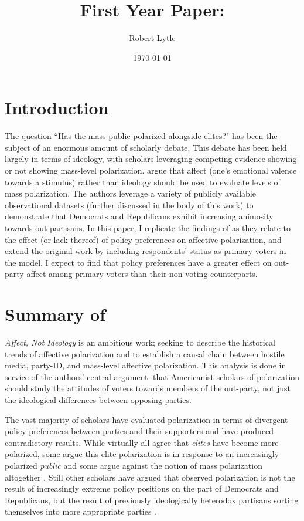 \documentclass[12pt]{article}
\begin{document}
\title{First Year Paper:\\ \large{\citet{iyengar2012affect}}}
\author{Robert Lytle}
\date{\today}
\maketitle
\thispagestyle{empty}
\clearpage
\section{Introduction}
The question ``Has the mass public polarized alongside elites?" has been the subject of an enormous amount of scholarly debate. This debate has been held largely in terms of ideology, with scholars leveraging competing evidence showing \citep{abramowitz2010disappearing} or not showing \citep{fiorina2012disconnect} mass-level polarization. \cite{iyengar2012affect} argue that affect (one's emotional valence towards a stimulus) rather than ideology should be used to evaluate levels of mass polarization. The authors leverage a variety of publicly available observational datasets
 (further discussed in the body of this work) to demonstrate that Democrats and Republicans exhibit increasing animosity towards out-partisans. In this paper, I replicate the findings of \cite{iyengar2012affect} as they relate to the effect (or lack thereof) of policy preferences on affective polarization, and extend the original work by including respondents' status as primary voters in the model. I expect to find that policy preferences have a greater effect on out-party affect among primary voters than their non-voting counterparts.


\section{Summary of \cite{iyengar2012affect}}
\textit{Affect, Not Ideology} is an ambitious work; seeking to describe the historical trends of affective polarization and to establish a causal chain between hostile media, party-ID, and mass-level affective polarization. This analysis is done in service of the authors' central argument: that Americanist scholars of polarization should study the attitudes of voters towards members of the out-party, not just the ideological differences between opposing parties.

The vast majority of scholars have evaluated polarization in terms of divergent policy preferences between parties and their supporters and have produced contradictory results. While virtually all agree that \textit{elites} have become more polarized, some argue this elite polarization is in response to an increasingly polarized \textit{public} \citep{abramowitz2010disappearing} and some argue against the notion of mass polarization altogether \citep{fiorina2012disconnect, fiorina2005culture}. Still other scholars have argued that observed polarization is not the result of increasingly extreme policy positions on the part of Democrats and Republicans, but the result of previously ideologically heterodox partisans sorting themselves into more appropriate parties \citep{levendusky2009partisan}.
\end{document}

